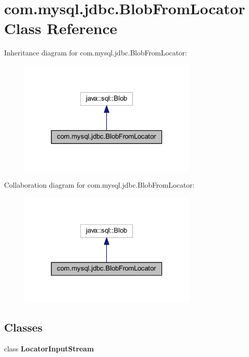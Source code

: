 \hypertarget{classcom_1_1mysql_1_1jdbc_1_1_blob_from_locator}{}\section{com.\+mysql.\+jdbc.\+Blob\+From\+Locator Class Reference}
\label{classcom_1_1mysql_1_1jdbc_1_1_blob_from_locator}


Inheritance diagram for com.\+mysql.\+jdbc.\+Blob\+From\+Locator\+:\nopagebreak
\begin{figure}[H]
\begin{center}
\leavevmode
\includegraphics[width=243pt]{classcom_1_1mysql_1_1jdbc_1_1_blob_from_locator__inherit__graph}
\end{center}
\end{figure}


Collaboration diagram for com.\+mysql.\+jdbc.\+Blob\+From\+Locator\+:\nopagebreak
\begin{figure}[H]
\begin{center}
\leavevmode
\includegraphics[width=243pt]{classcom_1_1mysql_1_1jdbc_1_1_blob_from_locator__coll__graph}
\end{center}
\end{figure}
\subsection*{Classes}
\begin{DoxyCompactItemize}
\item 
class {\bfseries Locator\+Input\+Stream}
\end{DoxyCompactItemize}
